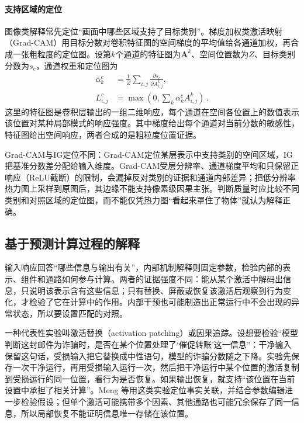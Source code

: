 \paragraph{支持区域的定位}

图像类解释常先定位“画面中哪些区域支持了目标类别”。梯度加权类激活映射（Grad-CAM）用目标分数对卷积特征图的空间梯度的平均值给各通道加权，再合成一张粗粒度的定位图。设第$k$个通道的特征图为$\bm A^k$、空间位置数为$Z$、目标类别分数为$s_c$，通道权重和定位图为
\begin{equation}
 \begin{aligned}
 \alpha_k^c&=\frac{1}{Z}\sum_{i,j}
 \frac{\partial s_c}{\partial A^k_{i,j}},\\
 L^c_{i,j}&=\max\!\left(0,\sum_k\alpha_k^c A^k_{i,j}\right)\, .
 \end{aligned}
 \label{eq:interpretability-gradcam}
\end{equation}
这里的特征图是卷积层输出的一组二维响应，每个通道在空间各位置上的数值表示该位置对某种局部模式的响应强度。其中梯度给出每个通道对当前分数的敏感性，特征图给出空间响应，两者合成的是粗粒度位置证据。

Grad-CAM与IG定位不同：Grad-CAM定位某层表示中支持类别的空间区域，IG把基准分数差分配给输入维度。Grad-CAM受层分辨率、通道梯度平均和只保留正响应（ReLU截断）的限制，会漏掉反对类别的证据和通道内部差异；把低分辨率热力图上采样到原图后，其边缘不能支持像素级因果主张。判断质量时应比较不同类别和对照区域的定位图，而不能仅凭热力图“看起来罩住了物体”就认为解释正确。

\subsection{基于预测计算过程的解释}
\label{sec:interpretability-local-mechanism}

输入响应回答“哪些信息与输出有关”，内部机制解释则固定参数，检验内部的表示、组件和通路如何参与计算。两者的证据强度不同：能从某个激活中解码出信息，只说明该表示含有这些信息；只有替换、屏蔽或恢复该激活后观察到行为变化，才检验了它在计算中的作用。内部干预也可能制造出正常运行中不会出现的异常状态，所以要设置匹配的对照。

一种代表性实验叫激活替换（activation patching）或因果追踪。设想要检验“模型判断这封邮件为诈骗时，是否在某个位置处理了‘催促转账’这一信息”：干净输入保留这句话，受损输入把它替换成中性语句，模型的诈骗分数随之下降。实验先保存一次干净运行，再用受损输入运行一次，然后把干净运行中某个位置的激活复制到受损运行的同一位置，看行为是否恢复。如果输出恢复，就支持“该位置在当前设置中承担了相关计算”。Meng 等用这类实验定位事实关联，并结合参数编辑进一步检验假设；但单个激活可能携带多个因素、其他通路也可能冗余保存了同一信息，所以局部恢复不能证明信息唯一存储在该位置。


